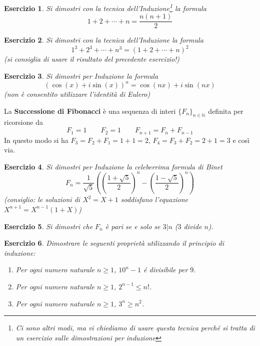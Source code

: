 \documentclass{article}
\newtheorem{es}{Esercizio}
\begin{document}
{\begin{es}
    Si dimostri con la tecnica dell'Induzione\footnote{Ci sono altri modi, ma vi chiediamo di usare questa tecnica perché si tratta di un esercizio sulle dimostrazioni per induzione} la formula
    $$1+2+\cdots +n= \frac{n(n+1)}{2}$$
\end{es}


\begin{es}
    Si dimostri con la tecnica dell'Induzione la formula
    $$1^3+2^3+\cdots +n^3= (1+2+\cdots +n)^2$$
    (si consiglia di usare il risultato del precedente esercizio!)
\end{es}

\begin{es}
    Si dimostri per Induzione la formula $$(\cos(x)+i\sin (x))^n=\cos(nx)+i\sin(nx)$$
    (non è consentito utilizzare l'identità di Eulero)
\end{es}


La \textbf{Successione di Fibonacci} è una sequenza di interi $\{F_n\}_{n\in \mathbb{N}}$ definita per ricorsione da $$F_1=1\qquad F_2=1\qquad F_{n+1}=F_{n}+F_{n-1}$$
In questo modo si ha $F_3=F_2+F_1=1+1=2$, $F_4=F_3+F_2=2+1=3$ e così via.\\


\begin{es}
    Si dimostri per Induzione la celeberrima formula di Binet
    $$F_n=\frac{1}{\sqrt{5}}\left(\left(\frac{1+\sqrt{5}}{2}\right)^n-\left(\frac{1-\sqrt{5}}{2}\right)^n\right)$$
    (consiglio: le soluzioni di $X^2=X+1$ soddisfano l'equazione $X^{n+1}=X^{n-1}(1+X)$)
\end{es}

\begin{es}
 Si dimostri che $F_n$ è pari se e solo se $3|n$ ($3$ divide $n$).
\end{es}


\begin{es}
    Dimostrare le seguenti proprietà utilizzando il principio di induzione:
\begin{enumerate}
    \item Per ogni numero naturale $n\ge1$, $10^n-1$ \'e divisibile per $9$.
    \item Per ogni numero naturale $n\ge1$, $2^{n-1}\le n!$.
    \item Per ogni numero naturale $n\ge1$, $3^n\ge n^2$.
\end{enumerate}
\end{es}

}
\end{document}

